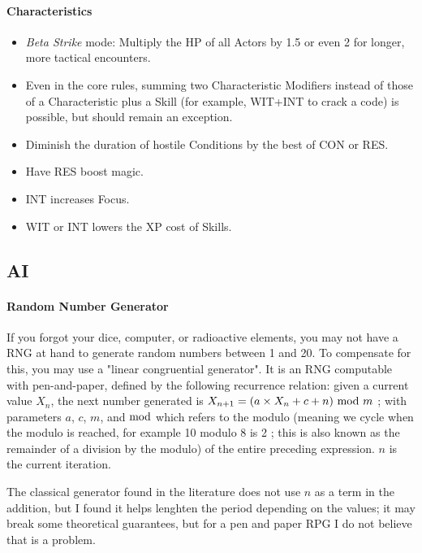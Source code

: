 \paragraph{Characteristics}

\begin{itemize}
    \item \textit{Beta Strike} mode: Multiply the HP of all Actors by 1.5 or even 2 for longer, more tactical encounters.
    \item Even in the core rules, summing two Characteristic Modifiers instead of those of a Characteristic plus a Skill (for example, WIT+INT to crack a code) is possible, but should remain an exception.
    \item Diminish the duration of hostile Conditions by the best of CON or RES.
    \item Have RES boost magic.
    \item INT increases Focus.
    \item WIT or INT lowers the XP cost of Skills.
\end{itemize}




\subsection{AI}

\paragraph{Random Number Generator}

If you forgot your dice, computer, or radioactive elements, you may not have a RNG at hand to generate random numbers between 1 and 20. To compensate for this, you may use a "linear congruential generator". It is an RNG computable with pen-and-paper, defined by the following recurrence relation: given a current value $X_n$, the next number generated is $X_{n+1}=(a \times X_n + c + n)\ \textup{mod}\ m$ ; with parameters $a$, $c$, $m$, and $\textup{mod}$ which refers to the modulo (meaning we cycle when the modulo is reached, for example 10 modulo 8 is 2 ; this is also known as the remainder of a division by the modulo) of the entire preceding expression. $n$ is the current iteration. 

The classical generator found in the literature does not use $n$ as a term in the addition, but I found it helps lenghten the period depending on the values; it may break some theoretical guarantees, but for a pen and paper RPG I do not believe that is a problem.

